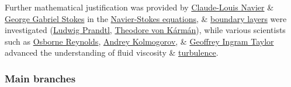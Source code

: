 \documentclass{article}
\begin{document}
Further mathematical justification was provided by \href{https://en.wikipedia.org/wiki/Claude-Louis_Navier}{Claude-Louis Navier} \& \href{https://en.wikipedia.org/wiki/George_Gabriel_Stokes}{George Gabriel Stokes} in the \href{https://en.wikipedia.org/wiki/Navier-Stokes_equations}{Navier-Stokes equations}, \& \href{https://en.wikipedia.org/wiki/Boundary_layers}{boundary layers} were investigated (\href{https://en.wikipedia.org/wiki/Ludwig_Prandtl}{Ludwig Prandtl}, \href{https://en.wikipedia.org/wiki/Theodore_von_K%C3%A1rm%C3%A1n}{Theodore von Kármán}), while various scientists such as \href{https://en.wikipedia.org/wiki/Osborne_Reynolds}{Osborne Reynolds}, \href{https://en.wikipedia.org/wiki/Andrey_Kolmogorov}{Andrey Kolmogorov}, \& \href{https://en.wikipedia.org/wiki/Geoffrey_Ingram_Taylor}{Geoffrey Ingram Taylor} advanced the understanding of fluid viscosity \& \href{https://en.wikipedia.org/wiki/Turbulence}{turbulence}.

\subsubsection{Main branches}
\end{document}
